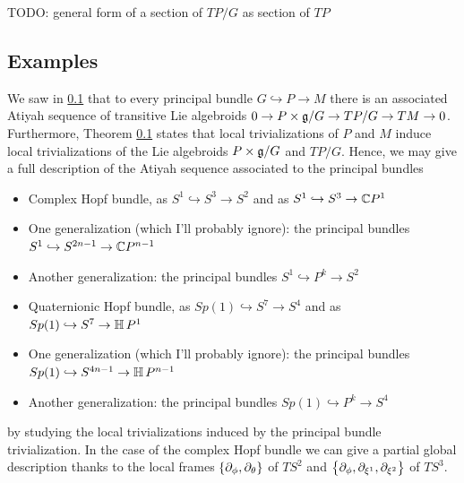 TODO: general form of a section of $TP/G$ as section of $TP$

\subsection{Examples}

We saw in \ref{} that to every principal bundle $G \hookrightarrow P \to M$ there is an associated Atiyah sequence of transitive Lie algebroids $0 \to P \times \mathfrak{g} / G \to TP/G \to TM \to 0$. Furthermore, Theorem \ref{} states that local trivializations of $P$ and $M$ induce local trivializations of the Lie algebroids $P \times \mathfrak{g}/G$ and $TP/G$. Hence, we may give a full description of the Atiyah sequence associated to the principal bundles
    \begin{itemize}
    
    \item Complex Hopf bundle, as $S^1 \hookrightarrow S^3 \to S^2$ and as $S^1 \hookrightarrow S^3 \to \mathbb{C} P^1$
    
    \item One generalization (which I'll probably ignore): the principal bundles $S^1 \hookrightarrow S^{2n - 1} \to \mathbb{C} P^{n-1}$
    
    \item Another generalization: the principal bundles $S^1 \hookrightarrow P^k \to S^2$
    
    \item Quaternionic Hopf bundle, as $Sp(1) \hookrightarrow S^7 \to S^4$ and as $Sp(1) \hookrightarrow S^7 \to \operatorname{\mathbb{H}} P^1$
    
    \item One generalization (which I'll probably ignore): the principal bundles $Sp(1) \hookrightarrow S^{4n - 1} \to \operatorname{\mathbb{H}} P^{n-1}$
    
    \item Another generalization: the principal bundles $Sp(1) \hookrightarrow P^k \to S^4$
    
    \end{itemize} 
by studying the local trivializations induced by the principal bundle trivialization. In the case of the complex Hopf bundle we can give a partial global description thanks to the local frames $\set{\partial_\phi, \partial_\theta}$ of $TS^2$ and $\set{\partial_\phi, \partial_{\xi^1}, \partial_{\xi^2}}$ of $TS^3$.

